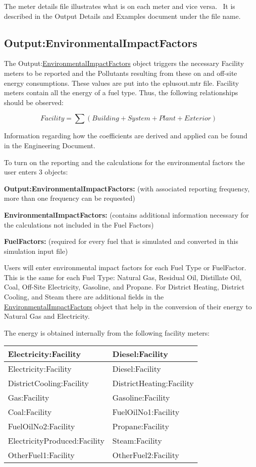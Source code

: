 The meter details file illustrates what is on each meter and vice versa.~ It is described in the Output Details and Examples document under the file name.

\subsection{Output:EnvironmentalImpactFactors}\label{outputenvironmentalimpactfactors}

The Output:\hyperref[environmentalimpactfactors]{EnvironmentalImpactFactors} object triggers the necessary Facility meters to be reported and the Pollutants resulting from these on and off-site energy consumptions. These values are put into the eplusout.mtr file. Facility meters contain all the energy of a fuel type. Thus, the following relationships should be observed:

\begin{equation}
Facility = \sum {\left( {Building + System + Plant + Exterior} \right)}
\end{equation}

Information regarding how the coefficients are derived and applied can be found in the Engineering Document.

To turn on the reporting and the calculations for the environmental factors the user enters 3 objects:

\textbf{Output:EnvironmentalImpactFactors:} (with associated reporting frequency, more than one frequency can be requested)

\textbf{EnvironmentalImpactFactors:} (contains additional information necessary for the calculations not included in the Fuel Factors)

\textbf{FuelFactors:} (required for every fuel that is simulated and converted in this simulation input file)

Users will enter environmental impact factors for each Fuel Type or FuelFactor. This is the same for each Fuel Type: Natural Gas, Residual Oil, Distillate Oil, Coal, Off-Site Electricity, Gasoline, and Propane. For District Heating, District Cooling, and Steam there are additional fields in the \hyperref[environmentalimpactfactors]{EnvironmentalImpactFactors} object that help in the conversion of their energy to Natural Gas and Electricity.

The energy is obtained internally from the following facility meters:

\begin{longtable}[c]{@{}ll@{}}
\toprule
Electricity:Facility & Diesel:Facility \tabularnewline
\midrule
\endfirsthead

\toprule
Electricity:Facility & Diesel:Facility \tabularnewline
\midrule
\endhead

DistrictCooling:Facility & DistrictHeating:Facility \tabularnewline
Gas:Facility & Gasoline:Facility \tabularnewline
Coal:Facility & FuelOilNo1:Facility \tabularnewline
FuelOilNo2:Facility & Propane:Facility \tabularnewline
ElectricityProduced:Facility & Steam:Facility \tabularnewline
OtherFuel1:Facility & OtherFuel2:Facility \tabularnewline
\bottomrule
\end{longtable}

